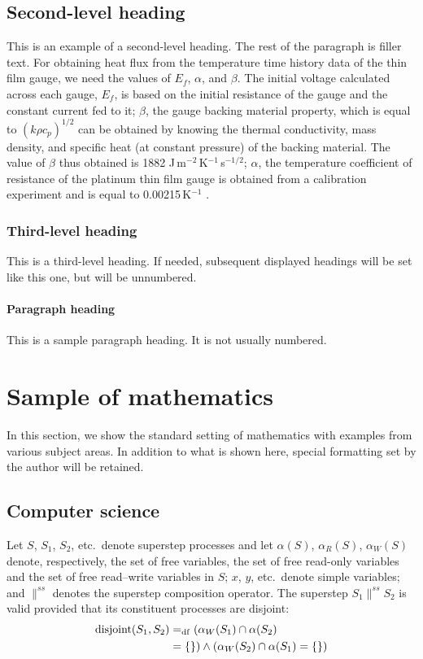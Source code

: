 \documentclass[twocolumn]{svjour3}          %
\begin{document}
\subsection{Second-level heading}
\label{level2} This is an example of a second-level heading. The
rest of the paragraph is filler text. For obtaining heat flux from
the temperature time history data of the thin film gauge, we need
the values of $E_{f}$, $\alpha$, and $\beta$. The initial voltage
calculated across each gauge, $E_f$, is  based on the initial
resistance of the gauge and the constant current fed to it;
$\beta$, the gauge backing material property, which is equal to
$(k \rho c_p)^{1/2}$ can be obtained by knowing the thermal
conductivity, mass density, and specific heat (at constant
pressure) of the backing material. The value of $\beta$ thus
obtained is 1882 J$\,$m$^{-2}$$\,$K$^{-1}$$\,$s$^{-1/2}$;
$\alpha$, the temperature coefficient of resistance of the
platinum thin film gauge is obtained from a calibration experiment
and is equal to 0.00215\,K$^{-1}$ .

\subsubsection{Third-level heading}
\label{level3} This is a third-level heading. If needed, subsequent displayed headings will be set like this one,
but will be unnumbered.

\paragraph{Paragraph heading}
This is a sample paragraph heading. It is not usually numbered.
%
\section{Sample of mathematics}
\label{se:basic_prop}

In this section, we show the standard setting of mathematics with
examples from various subject areas. In addition to what is shown
here, special formatting set by the author will be retained.

\subsection{Computer science}

Let $S$, $S_1$, $S_2$, etc.\ denote superstep processes and let
$\alpha(S)$, $\alpha_R(S)$, $\alpha_W(S)$ denote, respectively,
the set of free variables, the set of free read-only variables and
the set of free read--write variables in $S$; $x$, $y$, etc.\
denote simple variables; and $\parallel^{ss}$ denotes the
superstep composition operator. The superstep $S_1 \parallel^{ss}
S_2$ is valid provided that its constituent processes are
disjoint:
\begin{align}
\mathrm{disjoint}(S_1, S_2) \space &=_{\mathrm{df}} \space (\alpha_W(S_1)
\cap \alpha(S_2) \nonumber\\
&= \{\}) \wedge (\alpha_W(S_2) \cap \alpha(S_1) =
\{\} )
\end{align}
\end{document}
